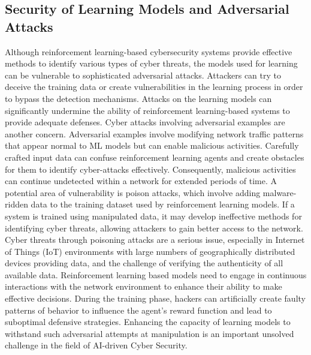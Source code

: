 \documentclass[12pt]{article}
\begin{document}
\subsection{Security of Learning Models and Adversarial Attacks}
Although reinforcement learning-based cybersecurity systems provide effective methods to identify various types of cyber threats, the models used for learning can be vulnerable to sophisticated adversarial attacks. Attackers can try to deceive the training data or create vulnerabilities in the learning process in order to bypass the detection mechanisms. Attacks on the learning models can significantly undermine the ability of reinforcement learning-based systems to provide adequate defenses.\cite{Chen2023}
Cyber attacks involving adversarial examples are another concern. Adversarial examples involve modifying network traffic patterns that appear normal to ML models but can enable malicious activities. Carefully crafted input data can confuse reinforcement learning agents and create obstacles for them to identify cyber-attacks effectively. Consequently, malicious activities can continue undetected within a network for extended periods of time.
A potential area of vulnerability is poison attacks, which involve adding malware-ridden data to the training dataset used by reinforcement learning models. If a system is trained using manipulated data, it may develop ineffective methods for identifying cyber threats, allowing attackers to gain better access to the network. Cyber threats through poisoning attacks are a serious issue, especially in Internet of Things (IoT) environments with large numbers of geographically distributed devices providing data, and the challenge of verifying the authenticity of all available data. 
Reinforcement learning based models need to engage in continuous interactions with the network environment to enhance their ability to make effective decisions. During the training phase, hackers can artificially create faulty patterns of behavior to influence the agent's reward function and lead to suboptimal defensive strategies. Enhancing the capacity of learning models to withstand such adversarial attempts at manipulation is an important unsolved challenge in the field of AI-driven Cyber Security.\cite{Ahmed2025,Gupta2024, Alnfiai2025, Ogenyi2025}
\end{document}
